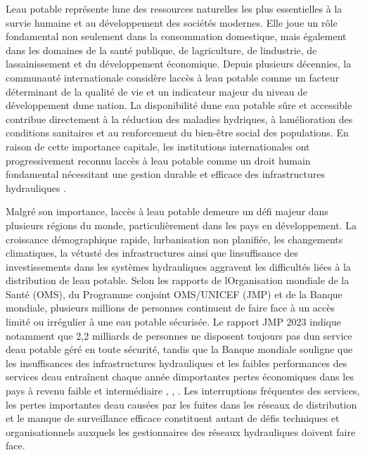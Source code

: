 \documentclass[12pt,a4paper,oneside]{report}
\begin{document}
L\textquotesingle eau potable représente l\textquotesingle une des
ressources naturelles les plus essentielles à la survie humaine et au
développement des sociétés modernes. Elle joue un rôle fondamental non
seulement dans la consommation domestique, mais également dans les
domaines de la santé publique, de l\textquotesingle agriculture, de
l\textquotesingle industrie, de l\textquotesingle assainissement et du
développement économique. Depuis plusieurs décennies, la communauté
internationale considère l\textquotesingle accès à l\textquotesingle eau
potable comme un facteur déterminant de la qualité de vie et un
indicateur majeur du niveau de développement d\textquotesingle une
nation. La disponibilité d\textquotesingle une eau potable sûre et
accessible contribue directement à la réduction des maladies hydriques,
à l\textquotesingle amélioration des conditions sanitaires et au
renforcement du bien-être social des populations. En raison de cette
importance capitale, les institutions internationales ont
progressivement reconnu l\textquotesingle accès à l\textquotesingle eau
potable comme un droit humain fondamental nécessitant une gestion
durable et efficace des infrastructures hydrauliques \cite{ref3}.

Malgré son importance, l\textquotesingle accès à l\textquotesingle eau
potable demeure un défi majeur dans plusieurs régions du monde,
particulièrement dans les pays en développement. La croissance
démographique rapide, l\textquotesingle urbanisation non planifiée, les
changements climatiques, la vétusté des infrastructures ainsi que
l\textquotesingle insuffisance des investissements dans les systèmes
hydrauliques aggravent les difficultés liées à la distribution de
l\textquotesingle eau potable. Selon les rapports de
l\textquotesingle Organisation mondiale de la Santé (OMS), du Programme
conjoint OMS/UNICEF (JMP) et de la Banque mondiale, plusieurs millions
de personnes continuent de faire face à un accès limité ou irrégulier à
une eau potable sécurisée. Le rapport JMP 2023 indique notamment que 2,2
milliards de personnes ne disposent toujours pas d\textquotesingle un
service d\textquotesingle eau potable géré en toute sécurité, tandis que
la Banque mondiale souligne que les insuffisances des infrastructures
hydrauliques et les faibles performances des services
d\textquotesingle eau entraînent chaque année
d\textquotesingle importantes pertes économiques dans les pays à revenu
faible et intermédiaire \cite{ref1}, \cite{ref4}, \cite{ref5}. Les interruptions
fréquentes des services, les pertes importantes d\textquotesingle eau
causées par les fuites dans les réseaux de distribution et le manque de
surveillance efficace constituent autant de défis techniques et
organisationnels auxquels les gestionnaires des réseaux hydrauliques
doivent faire face.
\end{document}
